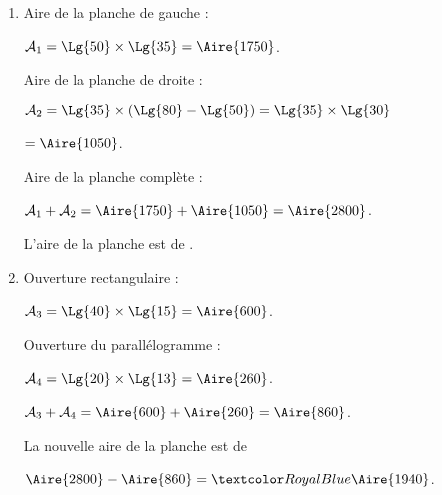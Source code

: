 \begin{Maquette}[Fiche,CorrigeFin,Colonnes=2]{}
\begin{multicols}{2}
      \begin{Solution}
         \begin{enumerate}
            \item Aire de la planche de gauche : \par
            $\mathcal{A}_1 =\Lg{50}\times\Lg{35} =\Aire{1750}$. \par
               Aire de la planche de droite : \par
               $\mathcal{A}_2 =\Lg{35}\times(\Lg{80}-\Lg{50}) =\Lg{35}\times\Lg{30}$ \par
               $=\Aire{1050}$. \par
               Aire de la planche complète : \par
               $\mathcal{A}_1+\mathcal{A}_2 =\Aire{1750}+\Aire{1050} =\Aire{2800}$. \par
               L'aire de la planche est de .
            \item Ouverture rectangulaire : \par
               $\mathcal{A}_3 =\Lg{40}\times\Lg{15} =\Aire{600}$. \par
               Ouverture du parallélogramme : \par
               $\mathcal{A}_4 =\Lg{20}\times\Lg{13} =\Aire{260}$. \par
               $\mathcal{A}_3+\mathcal{A}_4 =\Aire{600}+\Aire{260} =\Aire{860}$. \par
               La nouvelle aire de la planche est de \par
               $\Aire{2800}-\Aire{860} =\cor{\Aire{1940}}$.
         \end{enumerate}
      \end{Solution}

   \end{multicols}

\end{Maquette}


